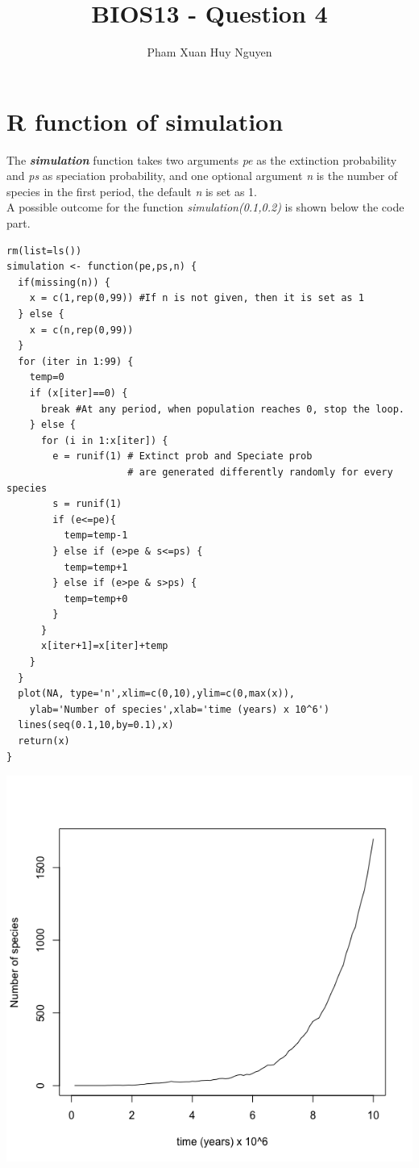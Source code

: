\documentclass{article}
\title{BIOS13 - Question 4}
\author{Pham Xuan Huy Nguyen}
\begin{document}
\maketitle
\section{R function of simulation}
The \textbf{\emph{simulation}} function takes two arguments \textit{pe} as the extinction probability and \textit{ps} as speciation probability, and one optional argument \textit{n} is the number of species in the first period, the default \textit{n} is set as 1.\\
A possible outcome for the function \textit{simulation(0.1,0.2)} is shown below the code part.
\begin{verbatim}
rm(list=ls())
simulation <- function(pe,ps,n) {
  if(missing(n)) {
    x = c(1,rep(0,99)) #If n is not given, then it is set as 1
  } else {
    x = c(n,rep(0,99))
  }
  for (iter in 1:99) {
    temp=0
    if (x[iter]==0) {
      break #At any period, when population reaches 0, stop the loop.
    } else {
      for (i in 1:x[iter]) {
        e = runif(1) # Extinct prob and Speciate prob 
                     # are generated differently randomly for every species
        s = runif(1)
        if (e<=pe){
          temp=temp-1
        } else if (e>pe & s<=ps) {
          temp=temp+1
        } else if (e>pe & s>ps) {
          temp=temp+0
        }
      }
      x[iter+1]=x[iter]+temp
    }
  }
  plot(NA, type='n',xlim=c(0,10),ylim=c(0,max(x)),
    ylab='Number of species',xlab='time (years) x 10^6')
  lines(seq(0.1,10,by=0.1),x) 
  return(x)
}
\end{verbatim}
\includegraphics[width=\textwidth]{images/4a.png}
\end{document}
